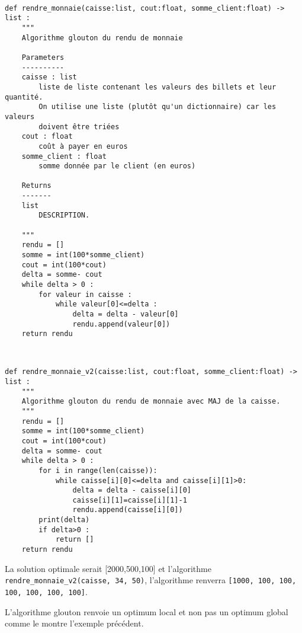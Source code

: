 


\begin{lstlisting}

def rendre_monnaie(caisse:list, cout:float, somme_client:float) -> list :
    """
    Algorithme glouton du rendu de monnaie

    Parameters
    ----------
    caisse : list
        liste de liste contenant les valeurs des billets et leur quantité.
        On utilise une liste (plutôt qu'un dictionnaire) car les valeurs
        doivent être triées
    cout : float
        coût à payer en euros
    somme_client : float
        somme donnée par le client (en euros)

    Returns
    -------
    list
        DESCRIPTION.

    """
    rendu = []
    somme = int(100*somme_client)
    cout = int(100*cout)
    delta = somme- cout
    while delta > 0 :
        for valeur in caisse :
            while valeur[0]<=delta :
                delta = delta - valeur[0]
                rendu.append(valeur[0])
    return rendu


\end{lstlisting}



\begin{lstlisting}

def rendre_monnaie_v2(caisse:list, cout:float, somme_client:float) -> list :
    """
    Algorithme glouton du rendu de monnaie avec MAJ de la caisse.
    """
    rendu = []
    somme = int(100*somme_client)
    cout = int(100*cout)
    delta = somme- cout
    while delta > 0 :
        for i in range(len(caisse)):
            while caisse[i][0]<=delta and caisse[i][1]>0:
                delta = delta - caisse[i][0]
                caisse[i][1]=caisse[i][1]-1
                rendu.append(caisse[i][0])
        print(delta)
        if delta>0 :
            return []
    return rendu

\end{lstlisting}



La solution optimale serait [2000,500,100] et l'algorithme \texttt{rendre\_monnaie\_v2(caisse, 34, 50)}, l'algorithme renverra \texttt{[1000, 100, 100, 100, 100, 100, 100]}.


L'algorithme glouton renvoie un optimum local et non pas un optimum global comme le montre l'exemple précédent.